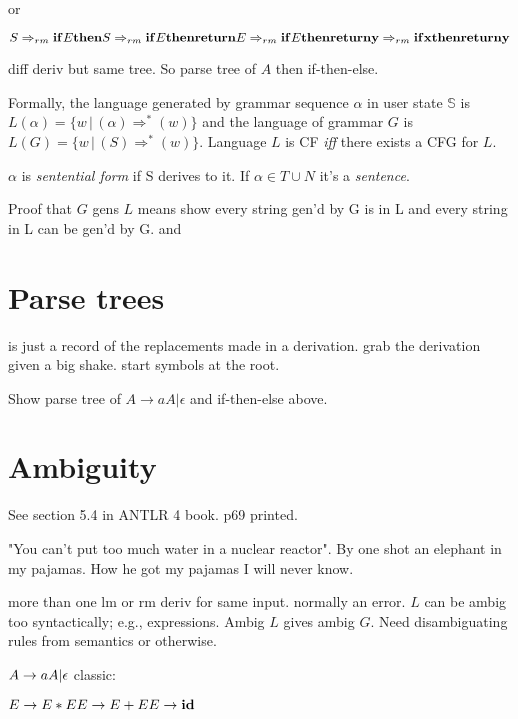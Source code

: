 \documentclass[11pt,twocolumn,nocopyright]{sigplanconf}
\newcommand{\store}{\mathbb{S}}
\begin{document}
or

$S \Rightarrow_{rm} {\bf if} E {\bf then} S \\
\Rightarrow_{rm} {\bf if} E {\bf then} {\bf return} E \\
\Rightarrow_{rm} {\bf if} E {\bf then} {\bf return} {\bf y}\\
\Rightarrow_{rm} {\bf if} {\bf x} {\bf then} {\bf return} {\bf y}$

diff deriv but same tree. So parse tree of $A$ then if-then-else.

Formally, the language generated by grammar sequence $\alpha$ in user state $\store$ is
$L(\alpha)=\{ w \, | \, (\alpha) \Rightarrow^*
(w)\}$ and the language of grammar $G$ is $L(G) = \{ w \, | \,
(S) \Rightarrow^* (w)\}$. Language $L$ is CF {\em iff} there exists a CFG for $L$.

$\alpha$ is {\em sentential form} if S derives to it. If $\alpha \in T \cup N$ it's a {\em sentence}.

Proof that $G$ gens $L$ means show every string gen'd by G is in L and every string in L can be gen'd by G. and

\section{Parse trees}

is just a record of the replacements made in a derivation. grab the derivation given a big shake. start symbols at the root.
 
Show parse tree of  $A \rightarrow a A | \epsilon$ and if-then-else above.

\section{Ambiguity}

See section 5.4 in ANTLR 4 book. p69 printed.

"You can't put too much water in a nuclear reactor". By one shot an elephant in my pajamas. How he got my pajamas I will never know.

more than one lm or rm deriv for same input. normally an error. $L$ can be ambig too syntactically; e.g., expressions. Ambig $L$ gives ambig $G$. Need disambiguating rules from semantics or otherwise.

\noindent $
A \rightarrow a A | \epsilon \\
$
classic:

\noindent $
E \rightarrow E * E\\
E \rightarrow E + E\\
E \rightarrow {\bf id}\\
$
\end{document}
